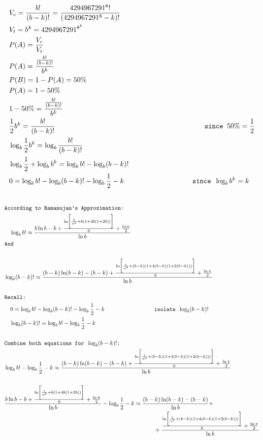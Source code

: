 \documentclass[fleqn, a4paper,12pt]{article}
\begin{document}
\[
\begin{aligned}
&V_c = \frac{b!}{(b-k)!} = \frac{4294967291^8!}{(4294967291^8-k)!} \\
&V_t = b^k = 4294967291^{8^k} \\
&P(A) = \frac{V_c}{V_t} \\
&P(A) = \frac{\frac{b!}{(b-k)!}}{b^k} \\
&P(B) = 1- P(A) = 50\%\\
&P(A) = 1 - 50\%\\
&1 - 50\% = \frac{\frac{b!}{(b-k)!}}{b^k} \\
&\frac{1}{2}b^k =  \frac{b!}{(b-k)!} \hspace{7.2cm} \texttt{ since }50\% = \frac{1}{2} \\
&\log_b\frac{1}{2}b^k = \log_b\frac{b!}{(b-k)!} \\
&\log_b\frac{1}{2} + \log_bb^k = \log_bb! - \log_b(b-k)! \\
&0 = \log_bb! - \log_b(b-k)! - \log_b\frac{1}{2} - k \hspace{3.2cm} \texttt{ since }\log_bb^k = k\\
\end{aligned}
\]
\thispagestyle{empty} %

\small
\[
\begin{aligned}
& \\
& \texttt{According to Ramanujan's Approximation: } \\
& \quad \log_bb! \approx \frac{b\ln b - b + \frac{\ln\biggl[\frac{1}{\pi^3} + b(1+4b(1+2b)) \biggr]}{6} + \frac{ln\pi}{2}}{\ln b} \\
& \texttt{And} \\
& \\
& \log_b(b-k)! \approx \frac{(b-k)\ln(b-k) - (b-k) + \frac{\ln \biggl[\frac{1}{\pi^3} +  (b-k)(1+4(b-k)(1+2(b-k)))\biggr]}{6} + \frac{\ln\pi}{2}}{\ln b} \\
& \\
& \texttt{Recall: } \\
& \quad 0 = \log_bb! - \log_b(b-k)! - \log_b\frac{1}{2} - k \hspace{2.8cm} \texttt{ isolate } \log_b(b-k)! \\
& \quad \log_b(b-k)! = \log_bb! - \log_b\frac{1}{2} - k \\
& \\
& \texttt{Combine both equations for } \log_b(b-k)! \texttt{: } \\
& \log_bb! - \log_b\frac{1}{2} - k \approx \frac{(b-k)\ln(b-k) - (b-k) + \frac{\ln \biggl[\frac{1}{\pi^3} + (b-k)(1+4(b-k)(1+2(b-k)))\biggr]}{6} + \frac{\ln\pi}{2}}{\ln b} \\
& \\
& \frac{b\ln b - b + \frac{\ln\biggl[\frac{1}{\pi^3} +  b(1+4b(1+2b)) \biggr]}{6} + \frac{\ln\pi}{2}}{\ln b} - \log_b\frac{1}{2} - k \approx \frac{(b-k)\ln(b-k) - (b-k)}{\ln b} +  \\ 
& \hspace{9cm} + \frac{\frac{\ln \biggl[\frac{1}{\pi^3} +  (b-k)(1+4(b-k)(1+2(b-k))) \biggr]}{6} + \frac{\ln\pi}{2}}{\ln b} \\
\end{aligned}
\]
\end{document}
